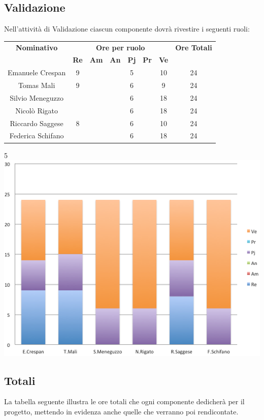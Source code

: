 \subsection{Validazione}
Nell’attività di Validazione ciascun componente dovrà rivestire i seguenti ruoli:
\begin{center}
  \centering
  \begin{tabular} {|c|c|c|c|c|c|c|c|}
    \hline
    \textbf{Nominativo} & \multicolumn{6}{|c|}{\textbf{Ore per ruolo}} & \textbf{Ore Totali} \\
    & \textbf{Re} & \textbf{Am} & \textbf{An} & \textbf{Pj} & \textbf{Pr} & \textbf{Ve} & \\
    \hline
    Emanuele Crespan &9 & & &5 & &10 &24\\
    \hline
    Tomas Mali &9 & & & 6& &9 &24\\
    \hline
    Silvio Meneguzzo & & & &6 & &18 &24\\
    \hline
    Nicolò Rigato & & & &6 & &18 &24\\
    \hline
    Riccardo Saggese &8 & & &6 & &10 &24\\
    \hline
    Federica Schifano & & & &6 & &18 &24\\
    \hline
  \end{tabular}
  5\includegraphics[scale=0.65]{img/fig6.png}
\end{center}

\subsection{Totali}
La tabella seguente illustra le ore totali che ogni componente dedicherà per il progetto, mettendo in evidenza anche quelle che verranno poi rendicontate.\\ \\


